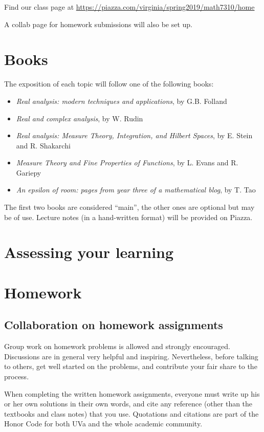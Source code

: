 \documentclass[oneside,11pt]{amsart}
\begin{document}
Find our class page at \url{https://piazza.com/virginia/spring2019/math7310/home}

A collab page for homework submissions will also be set up.

\section{Books}

The exposition of each topic will follow one
of the following books:
\begin{itemize}
	\item \emph{Real analysis: modern techniques and applications}, by G.B. Folland
	\item \emph{Real and complex analysis}, by W. Rudin
	\item \emph{Real analysis: Measure Theory, Integration, and Hilbert Spaces},
		by E. Stein and R. Shakarchi
	\item \emph{Measure Theory and Fine Properties of Functions},
		by L. Evans and R. Gariepy
	\item \emph{An epsilon of room: pages from year three of a mathematical blog},
		by T. Tao
\end{itemize}
The first two books are considered ``main'', 
the other ones are optional but may be of use.
Lecture notes (in a hand-written format)
will be provided on Piazza. 

\section{Assessing your learning}

\section{Homework}


\subsection{Collaboration on homework assignments}
\label{collaboration}

Group work on homework problems is allowed and strongly encouraged.
Discussions are in general very
helpful and inspiring. Nevertheless, before talking to others, get well started
on the problems, and contribute your fair share to the process. 

When completing the written homework assignments, everyone must write up his or her own
solutions in their own words, and cite any reference 
(other than the textbooks and
class notes) that you use. Quotations and citations are part of the Honor Code for both UVa
and the whole academic community. 
\end{document}
